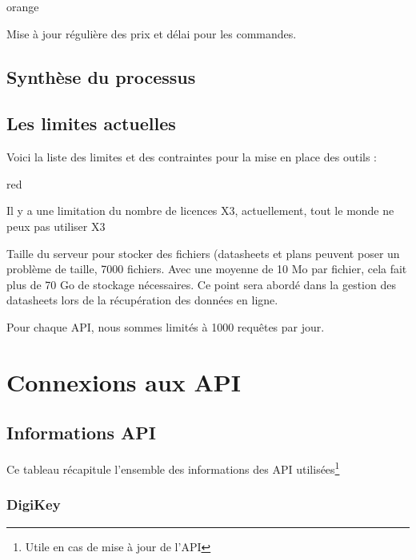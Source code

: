 {\begin{items}{orange}{\Bullet}
\item Mise à jour régulière des prix et délai pour les commandes.
\end{items}

\section{Synthèse du processus}


\section{Les limites actuelles}

Voici la liste des limites et des contraintes pour la mise en place des outils :
\begin{items}{red}{\Triangle}

\item Il y a une limitation du nombre de licences X3, actuellement, tout le monde ne peux pas
utiliser X3
\item Taille du serveur pour stocker des fichiers (datasheets et plans peuvent poser un problème
de taille, 7000 fichiers. Avec une moyenne de 10 Mo par fichier, cela fait plus de 70 Go de stockage nécessaires. Ce point sera abordé dans la gestion des datasheets lors de la récupération des données en ligne.
\item Pour chaque API, nous sommes limités à 1000 requêtes par jour.
\end{items}
\chapter{Connexions aux API}

\section{Informations API}

Ce tableau récapitule l'ensemble des informations des API utilisées\footnote{Utile en cas de mise à jour de l'API}\\

\subsection{DigiKey}

}
